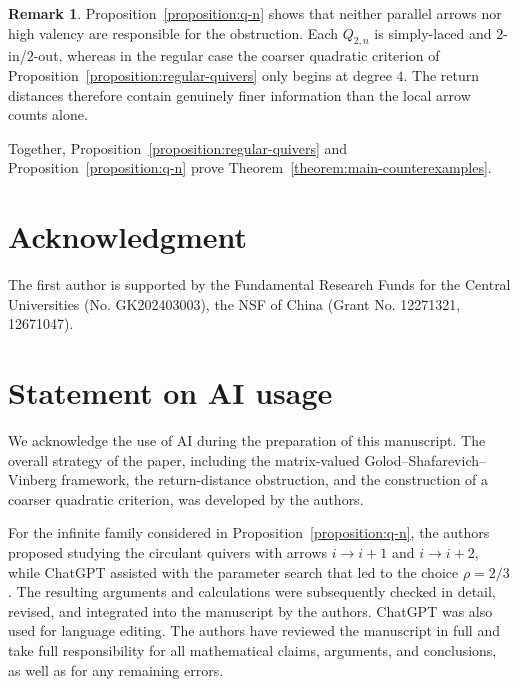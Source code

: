 \documentclass[11pt,letterpaper,reqno]{amsart}
\theoremstyle{definition}
\newtheorem{remark}[remark]{Remark}
\begin{document}
\begin{remark}
	Proposition~\ref{proposition:q-n} shows that neither parallel arrows nor
	high valency are responsible for the obstruction.  Each $Q_{2,n}$ is
	simply-laced and $2$-in/$2$-out, whereas in the regular case the coarser
	quadratic criterion of
	Proposition~\ref{proposition:regular-quivers} only begins at degree $4$.
	The return distances therefore contain genuinely finer information than
	the local arrow counts alone.
\end{remark}

Together, Proposition~\ref{proposition:regular-quivers} and
Proposition~\ref{proposition:q-n} prove
Theorem~\ref{theorem:main-counterexamples}.

    \section*{Acknowledgment}
    The first author is supported by the Fundamental Research Funds for the Central Universities (No. GK202403003), the NSF of China (Grant No. 12271321, 12671047). 
    
	\section*{Statement on AI usage}
	
	We acknowledge the use of AI during the preparation of this
	manuscript. The overall strategy of the paper, including the
	matrix-valued Golod--Shafarevich--Vinberg framework, the return-distance
	obstruction, and the construction of a coarser quadratic criterion, was developed
	by the authors.
	
	For the infinite family considered in
	Proposition~\ref{proposition:q-n}, the authors proposed studying the
	circulant quivers with arrows $i\longrightarrow i+1$ and
	$i\longrightarrow i+2$, while ChatGPT assisted with the parameter search
	that led to the choice \(\rho=2/3\). The resulting arguments and
	calculations were subsequently checked in detail, revised, and integrated
	into the manuscript by the authors. ChatGPT was also used for language
	editing. The authors have reviewed the manuscript in full and take full
	responsibility for all mathematical claims, arguments, and conclusions,
	as well as for any remaining errors.
	
\end{document}

